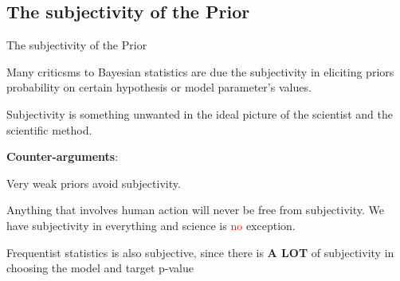 \subsection{The subjectivity of the Prior}
\begin{frame}{The subjectivity of the Prior}
	\begin{vfilleditems}
		\item Many criticsms to Bayesian statistics are due the subjectivity
		in eliciting priors probability on certain hypothesis or model parameter's values.
		\item Subjectivity is something unwanted in the ideal picture of the
		scientist and the scientific method.
	\end{vfilleditems}
	\textbf{Counter-arguments}:
	\begin{vfilleditems}
		\item Very weak priors avoid subjectivity.
		\item Anything that involves human action will never be free from
		subjectivity.
		We have subjectivity in everything and science is \textcolor{red}{no} exception.
		\item Frequentist statistics is also subjective, since there is \textbf{A LOT} of subjectivity in
		choosing the model and target p-value \parencite{jaynesProbabilityTheoryLogic2003, vandeschootBayesianStatisticsModelling2021}
	\end{vfilleditems}
\end{frame}


